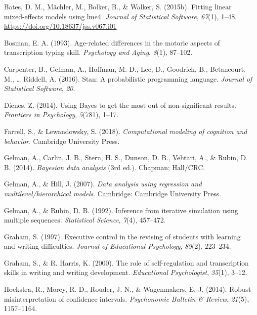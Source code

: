\documentclass[,man,floatsintext]{apa6}
\begin{document}
\leavevmode\hypertarget{ref-bates2015}{}%
Bates, D. M., Mächler, M., Bolker, B., \& Walker, S. (2015b). Fitting linear mixed-effects models using lme4. \emph{Journal of Statistical Software}, \emph{67}(1), 1--48. \url{https://doi.org/10.18637/jss.v067.i01}

\leavevmode\hypertarget{ref-bosman1993age}{}%
Bosman, E. A. (1993). Age-related differences in the motoric aspects of transcription typing skill. \emph{Psychology and Aging}, \emph{8}(1), 87--102.

\leavevmode\hypertarget{ref-carpenter2016stan}{}%
Carpenter, B., Gelman, A., Hoffman, M. D., Lee, D., Goodrich, B., Betancourt, M., \ldots{} Riddell, A. (2016). Stan: A probabilistic programming language. \emph{Journal of Statistical Software}, \emph{20}.

\leavevmode\hypertarget{ref-dienes2014using}{}%
Dienes, Z. (2014). Using Bayes to get the most out of non-significant results. \emph{Frontiers in Psychology}, \emph{5}(781), 1--17.

\leavevmode\hypertarget{ref-farrell2018computational}{}%
Farrell, S., \& Lewandowsky, S. (2018). \emph{Computational modeling of cognition and behavior}. Cambridge University Press.

\leavevmode\hypertarget{ref-gelman2014}{}%
Gelman, A., Carlin, J. B., Stern, H. S., Dunson, D. B., Vehtari, A., \& Rubin, D. B. (2014). \emph{Bayesian data analysis} (3rd ed.). Chapman; Hall/CRC.

\leavevmode\hypertarget{ref-gel07}{}%
Gelman, A., \& Hill, J. (2007). \emph{Data analysis using regression and multilevel/hierarchical models}. Cambridge: Cambridge University Press.

\leavevmode\hypertarget{ref-gelman1992}{}%
Gelman, A., \& Rubin, D. B. (1992). Inference from iterative simulation using multiple sequences. \emph{Statistical Science}, \emph{7}(4), 457--472.

\leavevmode\hypertarget{ref-graham1997executive}{}%
Graham, S. (1997). Executive control in the revising of students with learning and writing difficulties. \emph{Journal of Educational Psychology}, \emph{89}(2), 223--234.

\leavevmode\hypertarget{ref-graham2000role}{}%
Graham, S., \& R. Harris, K. (2000). The role of self-regulation and transcription skills in writing and writing development. \emph{Educational Psychologist}, \emph{35}(1), 3--12.

\leavevmode\hypertarget{ref-hoekstra2014robust}{}%
Hoekstra, R., Morey, R. D., Rouder, J. N., \& Wagenmakers, E.-J. (2014). Robust misinterpretation of confidence intervals. \emph{Psychonomic Bulletin \& Review}, \emph{21}(5), 1157--1164.
\end{document}

